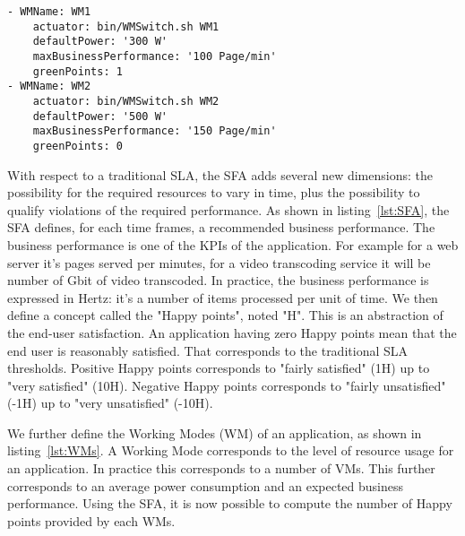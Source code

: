 \begin{lstlisting}[caption={Working Modes definition}, label={lst:WMs}]
- WMName: WM1
    actuator: bin/WMSwitch.sh WM1
    defaultPower: '300 W'
    maxBusinessPerformance: '100 Page/min'
    greenPoints: 1
- WMName: WM2
    actuator: bin/WMSwitch.sh WM2
    defaultPower: '500 W'
    maxBusinessPerformance: '150 Page/min'
    greenPoints: 0
\end{lstlisting}

With respect to a traditional SLA, the SFA adds several new dimensions: the possibility for the required resources to vary in time, plus the possibility to qualify violations of the required performance.
As shown in listing~\ref{lst:SFA}, the SFA defines, for each time frames, a recommended business performance. 
The business performance is one of the KPIs of the application.
For example for a web server it's pages served per minutes, for a video transcoding service it will be number of Gbit of video transcoded.
In practice, the business performance is expressed in Hertz: it's a number of items processed per unit of time.
We then define a concept called the "Happy points", noted "H".
This is an abstraction of the end-user satisfaction.
An application having zero Happy points mean that the end user is reasonably satisfied.
That corresponds to the traditional SLA thresholds.
Positive Happy points corresponds to "fairly satisfied" (1H) up to "very satisfied" (10H).
Negative Happy points corresponds to "fairly unsatisfied" (-1H) up to "very unsatisfied" (-10H).

We further define the Working Modes (WM) of an application, as shown in listing~\ref{lst:WMs}.
A Working Mode corresponds to the level of resource usage for an application.
In practice this corresponds to a number of VMs.
This further corresponds to an average power consumption and an expected business performance. 
Using the SFA, it is now possible to compute the number of Happy points provided by each WMs.

